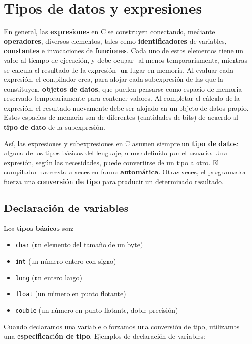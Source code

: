 \chapter{Tipos de datos y expresiones}
\label{chap:tc-tipos}
En general, las \textbf{expresiones} en C se construyen conectando, mediante \textbf{operadores}, diversos elementos, tales
como \textbf{identificadores} de variables, \textbf{constantes} e invocaciones de \textbf{funciones}. Cada uno de estos
elementos tiene un valor al tiempo de ejecución, y debe ocupar -al menos temporariamente, mientras se calcula el resultado de la expresión- un
lugar en memoria. Al evaluar cada expresión, el compilador crea, para alojar cada subexpresión de las
que la constituyen, \textbf{objetos de datos}, que pueden pensarse como espacio de memoria reservado temporariamente para
contener valores. Al completar el cálculo de la expresión, el resultado nuevamente debe ser alojado en un objeto de datos propio. Estos espacios de memoria son de diferentes  (cantidades de bits) de
acuerdo al \textbf{tipo de dato} de la subexpresión.

Así, las expresiones y subexpresiones en C asumen siempre un \textbf{tipo de datos}: alguno de los tipos básicos del lenguaje, o
uno definido por el usuario. Una expresión, según las necesidades, puede convertirse de un tipo a otro.
El compilador hace esto a veces en forma \textbf{automática}. Otras veces, el programador fuerza una
\textbf{conversión de tipo} para producir un determinado resultado.

\section{Declaración de variables}

Los \textbf{tipos básicos} son:
\begin{itemize}
	\item \lstinline{char} (un elemento del tamaño de un byte)
	\item \lstinline{int} (un número entero con signo)
	\item \lstinline{long} (un entero largo)
	\item \lstinline{float} (un número en punto flotante)
	\item \lstinline{double} (un número en punto flotante, doble precisión)
\end{itemize}

Cuando declaramos una variable o forzamos una conversión de tipo, utilizamos una \textbf{especificación de
tipo}. Ejemplos de declaración de variables:

